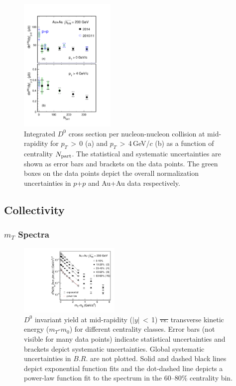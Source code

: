 \documentclass[%
 reprint,	
showpacs,
 amsmath,amssymb,
 aps,
 prc,
]{revtex4-1}
\providecommand{\DIFaddtex}[1]{{\protect\color{blue}\uwave{#1}}} %
\providecommand{\DIFdeltex}[1]{{\protect\color{red}\sout{#1}}}                      %
\providecommand{\DIFaddFL}[1]{\DIFadd{#1}} %
\providecommand{\DIFdelFL}[1]{\DIFdel{#1}} %
\providecommand{\DIFaddbeginFL}{} %
\providecommand{\DIFaddendFL}{} %
\providecommand{\DIFdelbeginFL}{} %
\providecommand{\DIFdelendFL}{} %
\providecommand{\DIFadd}[1]{\texorpdfstring{\DIFaddtex{#1}}{#1}} %
\providecommand{\DIFdel}[1]{\texorpdfstring{\DIFdeltex{#1}}{}} %
\begin{document}
\begin{figure}
\centering
\includegraphics[width=0.41\textwidth]{fig/Xsection_D0.pdf}
  \caption{Integrated $D^{0}$ cross section per nucleon-nucleon collision at mid-rapidity for $p_{T}$\,$>$\,0 (a) and $p_{T}$\,$>$\,4\,GeV/$c$ (b) as a function of centrality $N_{\rm part}$. The statistical and systematic uncertainties are shown as error bars and brackets on the data points. The green boxes on the data points depict the overall normalization uncertainties in $p$+$p$ and Au+Au data respectively.}
\label{fig:Xsection_D0} 
\end{figure}

\subsection{Collectivity}
\label{result:collectivity}

\subsubsection{$m_{T}$ Spectra}
\label{result:collectivity:mT}

\begin{figure}
\centering
\includegraphics[width=0.43\textwidth]{fig/mTFit_D0.pdf}
\caption{$D^{0}$ invariant yield at mid-rapidity ($|y|$\,$<$\,1) \DIFdelbeginFL \DIFdelFL{vs. }\DIFdelendFL \DIFaddbeginFL \DIFaddFL{as a function of }\DIFaddendFL transverse kinetic energy ($m_{T}$-$m_{0}$) for different centrality classes. Error bars (not visible for many data points) indicate statistical uncertainties and brackets depict systematic uncertainties. Global systematic uncertainties in $B.R.$ are not plotted. Solid and dashed black lines depict exponential function fits and the dot-dashed line depicts a power-law function fit to the spectrum in the 60--80\% centrality bin.}
\label{fig:mTFit_D0} 
\end{figure}
\end{document}
